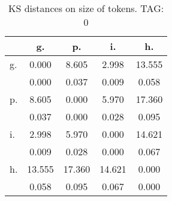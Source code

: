 \begin{table}[h!]
\begin{center}
\begin{tabular}{| l | c | c | c | c |}\hline
 & g. & p. & i. & h. \\\hline
g. & 0.000  & 8.605  & 2.998  & 13.555 \\\hline
 & 0.000  & 0.037  & 0.009  & 0.058 \\\hline
p. & 8.605  & 0.000  & 5.970  & 17.360 \\\hline
 & 0.037  & 0.000  & 0.028  & 0.095 \\\hline
i. & 2.998  & 5.970  & 0.000  & 14.621 \\\hline
 & 0.009  & 0.028  & 0.000  & 0.067 \\\hline
h. & 13.555  & 17.360  & 14.621  & 0.000 \\\hline
 & 0.058  & 0.095  & 0.067  & 0.000 \\\hline
\end{tabular}
\caption{KS distances on size of tokens. TAG: 0}
\end{center}
\end{table}